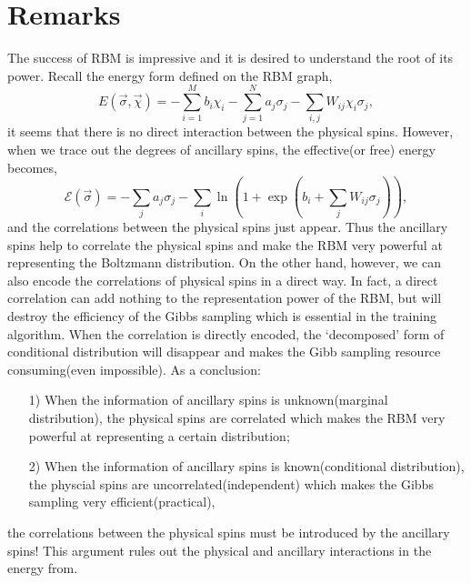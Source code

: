 \documentclass[letterpaper, 10pt]{article}
\begin{document}
\section{Remarks}
The success of RBM is impressive and it is desired to understand the root of its power. 
Recall the energy form defined on the RBM graph, 
\[ E(\vec{\sigma},\vec{\chi}) = - \sum_{i=1}^{M} b_i \chi_i - 
\sum_{j=1}^{N} a_j \sigma_j - \sum_{i,j} W_{ij} \chi_i \sigma_j, \]
it seems that there is no direct interaction between the physical spins. 
However, when we trace out the degrees of ancillary spins, the effective(or free) energy becomes,
\[ \mathcal{E}(\vec{\sigma}) = - \sum_{j} a_j \sigma_j - 
\sum_i \ln{( 1 + \exp{( b_i + \sum_j W_{ij} \sigma_j )} )}, \]
and the correlations between the physical spins just appear. 
Thus the ancillary spins help to correlate the physical spins 
and make the RBM very powerful at representing the Boltzmann distribution. 
On the other hand, however, we can also encode the correlations of physical spins in a direct way. 
In fact, a direct correlation can add nothing to the representation power of the RBM, 
but will destroy the efficiency of the Gibbs sampling which is essential in the training algorithm. 
When the correlation is directly encoded, the `decomposed' form of conditional distribution 
will disappear and makes the Gibb sampling resource consuming(even impossible). 
As a conclusion:
\begin{itemize}
	\item[1)]
	When the information of ancillary spins is unknown(marginal distribution), 
	the physical spins are correlated which makes the RBM very powerful 
	at representing a certain distribution;
	\item[2)]
	When the information of ancillary spins is known(conditional distribution),
	the physcial spins are uncorrelated(independent) which makes the Gibbs sampling very efficient(practical),
\end{itemize}
the correlations between the physical spins must be introduced by the ancillary spins! This argument rules out 
the physical and ancillary interactions in the energy from.
\end{document}
